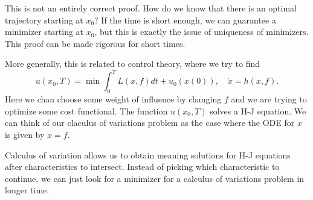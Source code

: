 \begin{remark}
    This is not an entirely correct proof. How do we know that there is an
optimal trajectory starting at $x_0$? If the time is short enough, we can guarantee a minimizer
starting at $x_0$, but this is exactly the issue of uniqueness of minimizers. This proof can be
made rigorous for short times.

\end{remark}

\begin{remark}
More generally, this is related to control theory, where we try to find 
\[
    u(x_0, T) = \min  \int_0^T L(x,f)dt + u_0(x(0)), \quad \dot x = h(x,f).
\]
Here we chan choose some weight of influence by changing $f$ and we are trying to optimize some cost functional. The function $u(x_0, T)$ solves a H-J equation. We can think of our claculus of variations problem as the case where the ODE for $x$ is given by $\dot x = f$.
\end{remark}

\begin{remark}
    Calculus of variation allows us to obtain meaning solutions for H-J equations after characteristics to intersect. Instead of picking which characteristic to continue, we can just  look for a minimizer for a calculus of variations problem in longer time.
\end{remark}
